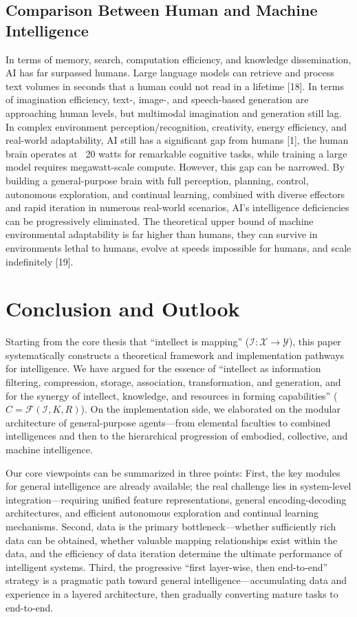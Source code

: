 \documentclass[12pt,a4paper]{article}
\begin{document}
\subsection{Comparison Between Human and Machine Intelligence}
In terms of memory, search, computation efficiency, and knowledge dissemination, AI has far surpassed humans. Large language models can retrieve and process text volumes in seconds that a human could not read in a lifetime [18].
In terms of imagination efficiency, text-, image-, and speech-based generation are approaching human levels, but multimodal imagination and generation still lag.
In complex environment perception/recognition, creativity, energy efficiency, and real-world adaptability, AI still has a significant gap from humans [1], the human brain operates at ~20 watts for remarkable cognitive tasks, while training a large model requires megawatt-scale compute.
However, this gap can be narrowed. By building a general-purpose brain with full perception, planning, control, autonomous exploration, and continual learning, combined with diverse effectors and rapid iteration in numerous real-world scenarios, AI's intelligence deficiencies can be progressively eliminated. The theoretical upper bound of machine environmental adaptability is far higher than humans, they can survive in environments lethal to humans, evolve at speeds impossible for humans, and scale indefinitely [19].

\section{Conclusion and Outlook}
Starting from the core thesis that “intellect is mapping” ($\mathcal{I}: \mathcal{X} \to \mathcal{Y}$), this paper systematically constructs a theoretical framework and implementation pathways for intelligence. We have argued for the essence of “intellect as information filtering, compression, storage, association, transformation, and generation, and for the synergy of intellect, knowledge, and resources in forming capabilities” ($C = \mathcal{F}(\mathcal{I}, K, R)$). On the implementation side, we elaborated on the modular architecture of general-purpose agents—from elemental faculties to combined intelligences and then to the hierarchical progression of embodied, collective, and machine intelligence.

Our core viewpoints can be summarized in three points:
First, the key modules for general intelligence are already available; the real challenge lies in system-level integration—requiring unified feature representations, general encoding-decoding architectures, and efficient autonomous exploration and continual learning mechanisms.
Second, data is the primary bottleneck—whether sufficiently rich data can be obtained, whether valuable mapping relationships exist within the data, and the efficiency of data iteration determine the ultimate performance of intelligent systems.
Third, the progressive “first layer-wise, then end-to-end” strategy is a pragmatic path toward general intelligence—accumulating data and experience in a layered architecture, then gradually converting mature tasks to end-to-end.
\end{document}
